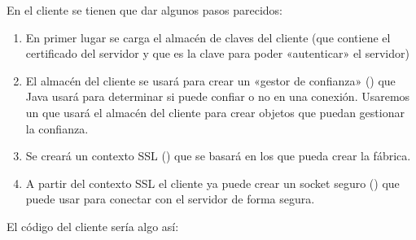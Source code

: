 \documentclass[letterpaper,10pt,spanish]{sphinxmanual}
\begin{document}
\begin{sphinxVerbatim}[commandchars=\\\{\}]
                             
                     
\end{sphinxVerbatim}

En el cliente se tienen que dar algunos pasos parecidos:
\begin{enumerate}
\def\theenumi{\arabic{enumi}}
\def\labelenumi{\theenumi .}
\makeatletter\def\p@enumii{\p@enumi \theenumi .}\makeatother
\item {} 
En primer lugar se carga el almacén de claves del cliente (que contiene el certificado del servidor y que es la clave para poder «autenticar» el servidor)

\item {} 
El almacén del cliente se usará para crear un «gestor de confianza» () que Java usará para determinar si puede confiar o no en una conexión. Usaremos un  que usará el almacén del cliente para crear objetos que puedan gestionar la confianza.

\item {} 
Se creará un contexto SSL () que se basará en los  que pueda crear la fábrica.

\item {} 
A partir del contexto SSL el cliente ya puede crear un socket seguro () que puede usar para conectar con el servidor de forma segura.

\end{enumerate}

El código del cliente sería algo así:
\end{document}
